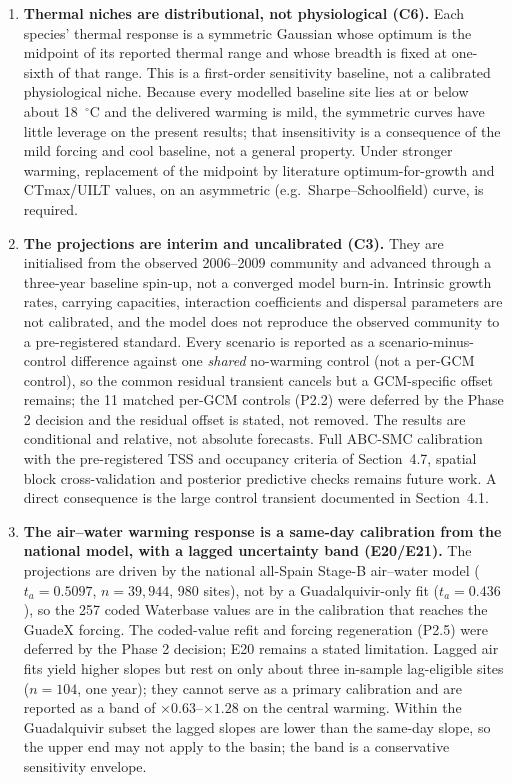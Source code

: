 \documentclass[11pt,a4paper]{article}
\begin{document}
\begin{enumerate}
    \item \textbf{Thermal niches are distributional, not physiological (C6).} Each species' thermal response is a symmetric Gaussian whose optimum is the midpoint of its reported thermal range and whose breadth is fixed at one-sixth of that range. This is a first-order sensitivity baseline, not a calibrated physiological niche. Because every modelled baseline site lies at or below about 18~$^\circ$C and the delivered warming is mild, the symmetric curves have little leverage on the present results; that insensitivity is a consequence of the mild forcing and cool baseline, not a general property. Under stronger warming, replacement of the midpoint by literature optimum-for-growth and CTmax/UILT values, on an asymmetric (e.g.\ Sharpe--Schoolfield) curve, is required.
    \item \textbf{The projections are interim and uncalibrated (C3).} They are initialised from the observed 2006--2009 community and advanced through a three-year baseline spin-up, not a converged model burn-in. Intrinsic growth rates, carrying capacities, interaction coefficients and dispersal parameters are not calibrated, and the model does not reproduce the observed community to a pre-registered standard. Every scenario is reported as a scenario-minus-control difference against one \emph{shared} no-warming control (not a per-GCM control), so the common residual transient cancels but a GCM-specific offset remains; the 11 matched per-GCM controls (P2.2) were deferred by the Phase 2 decision and the residual offset is stated, not removed. The results are conditional and relative, not absolute forecasts. Full ABC-SMC calibration with the pre-registered TSS and occupancy criteria of Section~4.7, spatial block cross-validation and posterior predictive checks remains future work. A direct consequence is the large control transient documented in Section~4.1.
    \item \textbf{The air--water warming response is a same-day calibration from the national model, with a lagged uncertainty band (E20/E21).} The projections are driven by the national all-Spain Stage-B air--water model ($t_a=0.5097$, $n=39{,}944$, 980 sites), not by a Guadalquivir-only fit ($t_a=0.436$), so the 257 coded Waterbase values are in the calibration that reaches the GuadeX forcing. The coded-value refit and forcing regeneration (P2.5) were deferred by the Phase 2 decision; E20 remains a stated limitation. Lagged air fits yield higher slopes but rest on only about three in-sample lag-eligible sites ($n=104$, one year); they cannot serve as a primary calibration and are reported as a band of $\times0.63$--$\times1.28$ on the central warming. Within the Guadalquivir subset the lagged slopes are lower than the same-day slope, so the upper end may not apply to the basin; the band is a conservative sensitivity envelope.

\end{enumerate}
\end{document}
